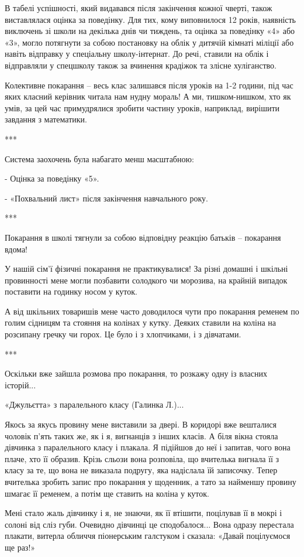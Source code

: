 В табелі успішності, який видавався після закінчення кожної чверті, також
виставлялася оцінка за поведінку. Для тих, кому виповнилося 12 років, наявність
виключень зі школи на декілька днів чи тиждень, та оцінка за поведінку «4» або
«3», могло потягнути за собою постановку на облік у дитячій кімнаті міліції або
навіть відправку у спеціальну школу-інтернат. До речі, ставили на облік і
відправляли у спецшколу також за вчинення крадіжок та злісне хуліганство. 

Колективне покарання – весь клас залишався після уроків на 1-2 години, під час
яких класний керівник читала нам нудну мораль! А ми, тишком-нишком, хто як
умів, за цей час примудрялися зробити частину уроків, наприклад, вирішити
завдання з математики.

***

Система заохочень була набагато менш масштабною:

- Оцінка за поведінку «5».

- «Похвальний лист» після закінчення навчального року.

***

Покарання в школі тягнули за собою відповідну реакцію батьків – покарання
вдома!

У нашій сім’ї фізичні покарання не практикувалися! За різні домашні і шкільні
провинності мене могли позбавити солодкого чи морозива, на крайній випадок
поставити на годинку носом у куток. 

А від шкільних товаришів мене часто доводилося чути про покарання ременем по
голим сідницям та стояння на колінах у кутку. Деяких ставили на коліна на
розсипану гречку чи горох. Це було і з хлопчиками, і з дівчатами.

***

Оскільки вже зайшла розмова про покарання, то розкажу одну із власних історій... 

«Джульєтта» з паралельного класу (Галинка Л.)...

Якось за якусь провину мене виставили за двері. В коридорі вже вешталися
чоловік п’ять таких же, як і я, вигнанців з інших класів. А біля вікна стояла
дівчинка з паралельного класу і плакала. Я підійшов до неї і запитав, чого вона
плаче, хто її образив. Крізь сльози вона розповіла, що вчителька вигнала її з
класу за те, що вона не виказала подругу, яка надіслала їй записочку. Тепер
вчителька зробить запис про покарання у щоденник, а тато за найменшу провину
шмагає її ременем, а потім ще ставить на коліна у куток.

Мені стало жаль дівчинку і я, не знаючи, як її втішити, поцілував її в мокрі і
солоні від сліз губи. Очевидно дівчинці це сподобалося... Вона одразу перестала
плакати, витерла обличчя піонерським галстуком і сказала: «Давай поцілуємося ще
раз!» 

